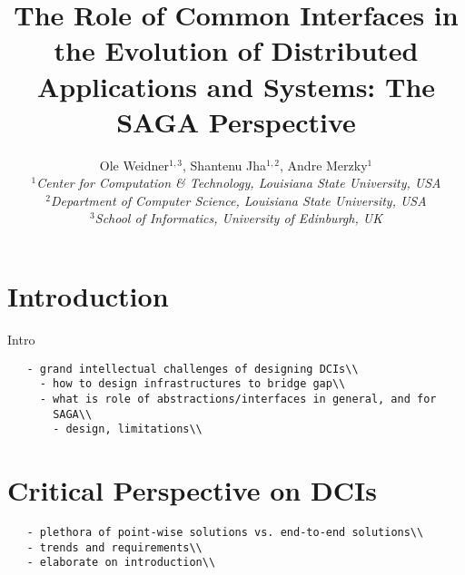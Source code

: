 \documentclass[a4paper,10pt]{article}
\begin{document}
 \title{ \large \vspace{-3.5em} The Role of Common Interfaces in the Evolution of Distributed Applications and Systems: The SAGA Perspective}


 \author{\normalsize Ole Weidner$^{1,3}$, Shantenu Jha$^{1,2}$, Andre Merzky$^{1}$\\
   \small{\emph{$^{1}$Center for Computation \& Technology, Louisiana State University, USA}}\\
   \small{\emph{$^{2}$Department of Computer Science, Louisiana State University, USA}}\\
   \small{\emph{$^{3}$School of Informatics, University of Edinburgh, UK}}
 }
 \date{}
 \maketitle

 
\section{Introduction}
 \label{intro}

  Intro

 \begin{verbatim}
   - grand intellectual challenges of designing DCIs\\
     - how to design infrastructures to bridge gap\\
     - what is role of abstractions/interfaces in general, and for
       SAGA\\
       - design, limitations\\
 \end{verbatim}

\section{Critical Perspective on DCIs}

 \begin{verbatim}
   - plethora of point-wise solutions vs. end-to-end solutions\\
   - trends and requirements\\
   - elaborate on introduction\\
 \end{verbatim}
\end{document}
